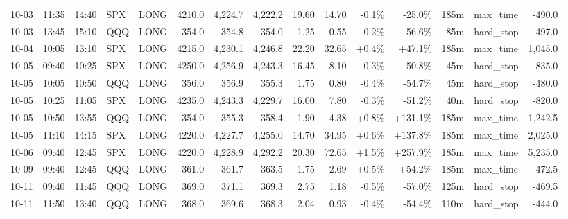 \documentclass[11pt,a4paper,twoside]{article}
\begin{document}
\begin{landscape}
\begin{center}
\begin{longtable}{>{\color{txtmain}}l l l l l r r r r r r r r >{\color{txtmain}}l r}
10-03 & 11:35 & 14:40 & SPX & LONG & 4210.0 & 4,224.7 & 4,222.2 & 19.60 & 14.70 & \textcolor{lossred}{-0.1\%} & \textcolor{lossred}{-25.0\%} & 185m & max\_time & \textcolor{lossred}{-490.0} \\
10-03 & 13:45 & 15:10 & QQQ & LONG & 354.0 & 354.8 & 354.0 & 1.25 & 0.55 & \textcolor{lossred}{-0.2\%} & \textcolor{lossred}{-56.6\%} & 85m & hard\_stop & \textcolor{lossred}{-497.0} \\
10-04 & 10:05 & 13:10 & SPX & LONG & 4215.0 & 4,230.1 & 4,246.8 & 22.20 & 32.65 & \textcolor{wingreen}{+0.4\%} & \textcolor{wingreen}{+47.1\%} & 185m & max\_time & \textcolor{wingreen}{1,045.0} \\
10-05 & 09:40 & 10:25 & SPX & LONG & 4250.0 & 4,256.9 & 4,243.3 & 16.45 & 8.10 & \textcolor{lossred}{-0.3\%} & \textcolor{lossred}{-50.8\%} & 45m & hard\_stop & \textcolor{lossred}{-835.0} \\
10-05 & 10:05 & 10:50 & QQQ & LONG & 356.0 & 356.9 & 355.3 & 1.75 & 0.80 & \textcolor{lossred}{-0.4\%} & \textcolor{lossred}{-54.7\%} & 45m & hard\_stop & \textcolor{lossred}{-480.0} \\
10-05 & 10:25 & 11:05 & SPX & LONG & 4235.0 & 4,243.3 & 4,229.7 & 16.00 & 7.80 & \textcolor{lossred}{-0.3\%} & \textcolor{lossred}{-51.2\%} & 40m & hard\_stop & \textcolor{lossred}{-820.0} \\
10-05 & 10:50 & 13:55 & QQQ & LONG & 354.0 & 355.3 & 358.4 & 1.90 & 4.38 & \textcolor{wingreen}{+0.8\%} & \textcolor{wingreen}{+131.1\%} & 185m & max\_time & \textcolor{wingreen}{1,242.5} \\
10-05 & 11:10 & 14:15 & SPX & LONG & 4220.0 & 4,227.7 & 4,255.0 & 14.70 & 34.95 & \textcolor{wingreen}{+0.6\%} & \textcolor{wingreen}{+137.8\%} & 185m & max\_time & \textcolor{wingreen}{2,025.0} \\
10-06 & 09:40 & 12:45 & SPX & LONG & 4220.0 & 4,228.9 & 4,292.2 & 20.30 & 72.65 & \textcolor{wingreen}{+1.5\%} & \textcolor{wingreen}{+257.9\%} & 185m & max\_time & \textcolor{wingreen}{5,235.0} \\
10-09 & 09:40 & 12:45 & QQQ & LONG & 361.0 & 361.7 & 363.5 & 1.75 & 2.69 & \textcolor{wingreen}{+0.5\%} & \textcolor{wingreen}{+54.2\%} & 185m & max\_time & \textcolor{wingreen}{472.5} \\
10-11 & 09:40 & 11:45 & QQQ & LONG & 369.0 & 371.1 & 369.3 & 2.75 & 1.18 & \textcolor{lossred}{-0.5\%} & \textcolor{lossred}{-57.0\%} & 125m & hard\_stop & \textcolor{lossred}{-469.5} \\
10-11 & 11:50 & 13:40 & QQQ & LONG & 368.0 & 369.6 & 368.3 & 2.04 & 0.93 & \textcolor{lossred}{-0.4\%} & \textcolor{lossred}{-54.4\%} & 110m & hard\_stop & \textcolor{lossred}{-444.0} \\

\end{longtable}
\end{center}
\end{landscape}
\end{document}
